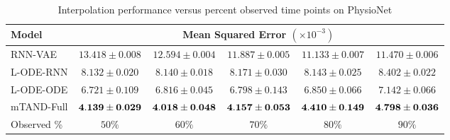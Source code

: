 \begin{table}[t]
\centering
\scriptsize
\caption{Interpolation performance versus percent observed time points on PhysioNet}
\label{table:phy_interp}
\begin{tabular}[h]{l c c c c c}
     \toprule
     {\bf Model} & \multicolumn{5}{c}{{\bf Mean Squared Error} $(\times 10^{-3})$} \\
     \midrule
     RNN-VAE &  $13.418 \pm 0.008$ & $ 12.594 \pm 0.004$ & $11.887 \pm 0.005$ & $11.133 \pm 0.007$ & $ 11.470 \pm 0.006$\\
     L-ODE-RNN & $8.132 \pm 0.020$ & $ 8.140 \pm 0.018$ & $8.171 \pm 0.030$ & $8.143 \pm 0.025$ & $ 8.402 \pm 0.022$ \\
     L-ODE-ODE &  $6.721 \pm 0.109$ & $ 6.816 \pm 0.045$ & $6.798 \pm 0.143$ & $6.850 \pm 0.066$ & $ 7.142 \pm 0.066$\\
     mTAND-Full & ${\bf 4.139} \pm {\bf 0.029}$ & ${\bf 4.018} \pm {\bf 0.048}$ & ${\bf 4.157} \pm {\bf 0.053}$ &  ${\bf 4.410} \pm {\bf 0.149}$ & ${\bf 4.798} \pm {\bf 0.036}$ \\
     \midrule
     Observed \%  & $50\%$ & $60\%$ & $70\%$ & $80\%$ & $90\%$ \\ 
    \bottomrule
\end{tabular}
\end{table}

